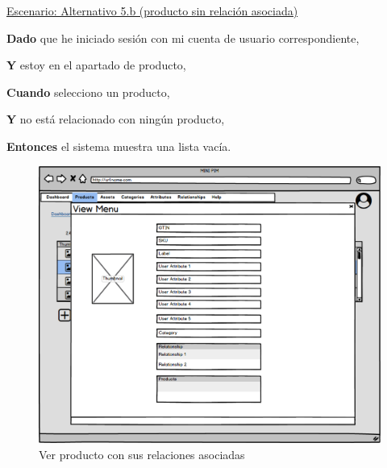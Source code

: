 \vspace{0.20cm}

\underline{Escenario: Alternativo 5.b (producto sin relación asociada)}\par
\vspace{0.15cm}
\textbf{Dado} que he iniciado sesión con mi cuenta de usuario correspondiente,\par
\textbf{Y} estoy en el apartado de producto,\par
\textbf{Cuando} selecciono un producto,\par
\textbf{Y} no está relacionado con ningún producto,\par
\textbf{Entonces} el sistema muestra una lista vacía.\par

\vspace{0.20cm}

\begin{figure}[H]
    \includegraphics[width=1\linewidth]{assets/mockups/RF5.2_1.png}
    \caption{Ver producto con sus relaciones asociadas}
   \end{figure}
\vspace{1.0cm}

